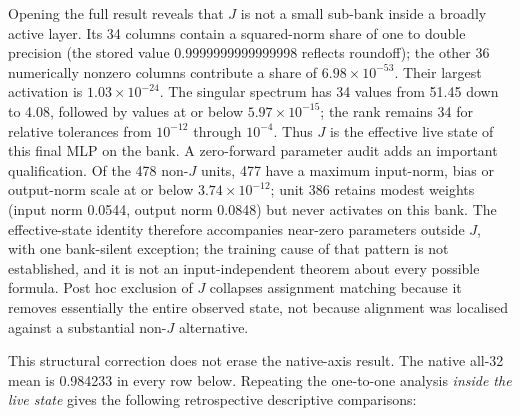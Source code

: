 \documentclass[
  british,
  11pt,
  a4paper,
]{article}
\begin{document}
Opening the full result reveals that \(J\) is not a small sub-bank
inside a broadly active layer. Its 34 columns contain a squared-norm
share of one to double precision (the stored value 0.9999999999999998
reflects roundoff); the other 36 numerically nonzero columns contribute
a share of \(6.98\times10^{-53}\). Their largest activation is
\(1.03\times10^{-24}\). The singular spectrum has 34 values from 51.45
down to 4.08, followed by values at or below \(5.97\times10^{-15}\); the
rank remains 34 for relative tolerances from \(10^{-12}\) through
\(10^{-4}\). Thus \(J\) is the effective live state of this final MLP on
the bank. A zero-forward parameter audit adds an important
qualification. Of the 478 non-\(J\) units, 477 have a maximum
input-norm, bias or output-norm scale at or below
\(3.74\times10^{-12}\); unit 386 retains modest weights (input norm
0.0544, output norm 0.0848) but never activates on this bank. The
effective-state identity therefore accompanies near-zero parameters
outside \(J\), with one bank-silent exception; the training cause of
that pattern is not established, and it is not an input-independent
theorem about every possible formula. Post hoc exclusion of \(J\)
collapses assignment matching because it removes essentially the entire
observed state, not because alignment was localised against a
substantial non-\(J\) alternative.

This structural correction does not erase the native-axis result. The
native all-32 mean is 0.984233 in every row below. Repeating the
one-to-one analysis \emph{inside the live state} gives the following
retrospective descriptive comparisons:
\end{document}
